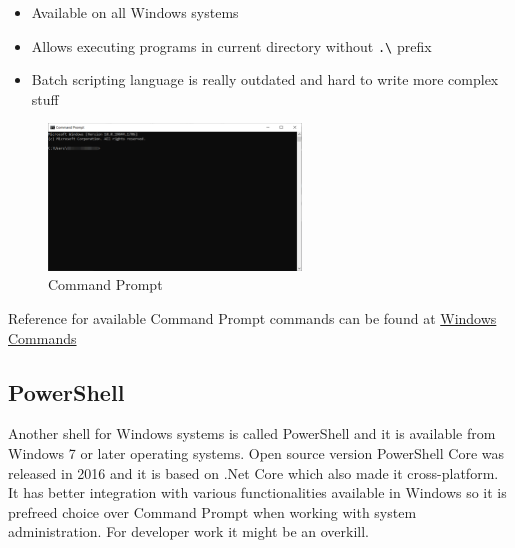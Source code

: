 \documentclass[lang=en,color=green]{elegantbook}
\begin{document}
\noindent\begin{minipage}[t]{0.5\textwidth}%
    \begin{itemize}[leftmargin=*]
        \item Available on all Windows systems
        \item Allows executing programs in current directory without  \lstinline{.\}  prefix
    \end{itemize}
\end{minipage}%
\begin{minipage}[t]{0.5\textwidth}%
    \begin{itemize}[leftmargin=*]
        \item Batch scripting language is really outdated and hard to write more complex stuff
    \end{itemize}
\end{minipage}%

\begin{figure}[htbp]
    \centering
    \includegraphics[width=0.6\textwidth]{images/command-prompt.png}
    \caption{Command Prompt\label{fig:Command Prompt}}
\end{figure}

Reference for available Command Prompt commands can be found at \href{https://docs.microsoft.com/en-us/windows-server/administration/windows-commands/windows-commands}{Windows Commands}

\subsection{PowerShell} 
Another shell for Windows systems is called PowerShell and it is available from
Windows 7 or later operating systems. Open source version PowerShell Core was released in 2016 and  
it is based on .Net Core which also made it cross-platform. It has better integration
with various functionalities available in Windows so it is prefreed choice over Command Prompt
when working with system administration. For developer work it might be an overkill.
\end{document}
